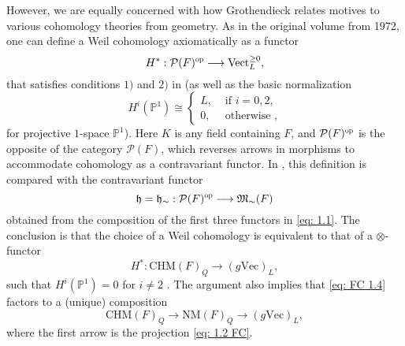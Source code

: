 \documentclass[preprint,12pt, leqno]{elsarticle}
\newcommand{\cP}{\mathcal{P}}
\newcommand{\fM}{\mathfrak{M}}
\numberwithin{equation}{section}
\theoremstyle{named}
\begin{document}
However, we are equally concerned with how Grothendieck relates motives to various cohomology theories from geometry. As in the original volume \cite{R} from 1972, one can define a Weil cohomology axiomatically as a functor
\begin{equation}\label{eq: FC 1.3}
     H^*: \mathcal{P}(F)^{\scalebox{0.7}{\mbox{op}}}\longrightarrow \mbox{Vect}_L^{\ge 0},
\end{equation}
that satisfies conditions $1)$ and $2)$ in \cite[3.1.1.1]{Andre1} (as well as the basic normalization 
\begin{equation*}
    H^i(\mathbb{P}^1) \cong \begin{cases}
        L, & \mbox{ if } i = 0, 2,\\
        0, & \mbox{ otherwise ,}
    \end{cases}
\end{equation*}
for projective $1$-space $\mathbb{P}^1$). Here $K$ is any field containing $F$, and $\mathcal{P}(F)^{\scalebox{0.7}{\mbox{op}}}$ is the opposite of the category $\cP(F)$, which reverses arrows in morphisms to accommodate cohomology as a contravariant functor. In \cite[4.2.1-4.2.5]{Andre1}, this definition is compared with the contravariant functor
\begin{equation*}
    \mathfrak{h} = \mathfrak{h}_{\sim} : \mathcal{P}(F)^{\scalebox{0.7}{\mbox{op}}}\longrightarrow \fM_{\sim}(F)
\end{equation*}
obtained from the composition of the first three functors in \eqref{eq: 1.1}. The conclusion is that the choice of a Weil cohomology is equivalent to that of a $\otimes$-functor 
\begin{equation}\label{eq: FC 1.4}
    H^*: \mbox{CHM}(F)_Q\longrightarrow (g\mbox{Vec})_L, 
\end{equation}
such that $H^i(\mathbb{P}^1) = 0$ for $i\neq 2$ \cite[Proposition 4.2.5.1]{Andre1}. The argument also implies that \eqref{eq: FC 1.4} factors to a (unique) composition
\begin{equation}\label{eq: FC 1.5}
    \mbox{CHM}(F)_Q\longrightarrow \mbox{NM}(F)_Q \longrightarrow (g\mbox{Vec})_L,
\end{equation}
where the first arrow is the projection \eqref{eq: 1.2 FC}. 
\end{document}
